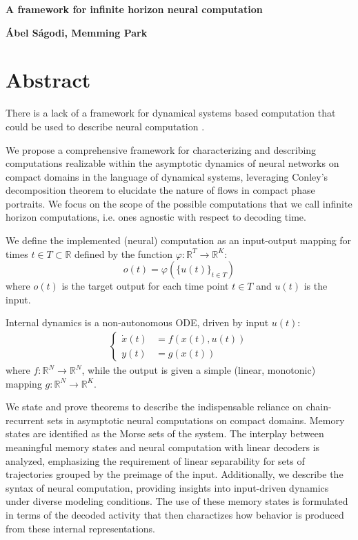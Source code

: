 \documentclass[12pt,letterpaper, onecolumn]{article}
\theoremstyle{definition}
\theoremstyle{remark}
\newcommand{\reals}{\mathbb{R}}
\begin{document}

\begin{center}
\LARGE{\textbf{A framework for infinite horizon neural computation}}
\end{center}
\begin{center}
{\textbf{\'Abel S\'agodi, Memming Park}}
\end{center}

\section*{Abstract}
There is a lack of a framework for dynamical systems based computation that could be used to describe neural computation \cite{jaeger2021}.


We propose a comprehensive framework for characterizing and describing computations realizable within the asymptotic dynamics of neural networks on compact domains in the language of dynamical systems, leveraging Conley's decomposition theorem to elucidate the nature of flows in compact phase portraits.
We focus on the scope of the possible computations that we call infinite horizon computations, i.e. ones agnostic with respect to decoding time. 

We define the implemented (neural) computation as an input-output mapping for times $t\in T\subset\reals$ defined by the function $\varphi:\reals^T\rightarrow\reals^K$:
\begin{equation}
o(t) = \varphi(\{u(t)\}_{t\in T})
\end{equation}
where $o(t)$ is the target output for each time point $t\in T$ and  $u(t)$ is the input.

Internal dynamics is a non-autonomous ODE, driven by input $u(t)$:
\begin{align}
\begin{cases}
\dot x(t) &= f(x(t),u(t))\\
y(t) &= g(x(t))
\end{cases} 
\end{align}
where $f:\reals^N\rightarrow\reals^N$,
while the output is given a simple (linear, monotonic) mapping $g:\reals^N\rightarrow\reals^K$.
 
 
 We state and prove theorems to describe the indispensable reliance on chain-recurrent sets in asymptotic neural computations on compact domains. Memory states are identified as the Morse sets of the system. The interplay between meaningful memory states and neural computation with linear decoders is analyzed, emphasizing the requirement of linear separability for sets of trajectories grouped by the preimage of the input. 
Additionally, we describe the syntax of neural computation, providing insights into input-driven dynamics under diverse modeling conditions.
The use of these memory states is formulated in terms of the decoded activity that then charactizes how behavior is produced from these internal representations. 
\end{document}
